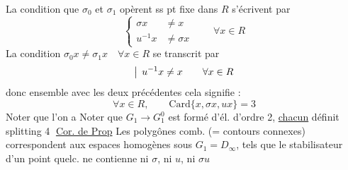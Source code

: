 La condition que  $\sigma_0$ et $\sigma_1$  opèrent ss pt
fixe dans $R$ s'écrivent par
\[
\left\{\begin{aligned}\sigma x&\ne x\\u^{-1}x&\ne\sigma x\end{aligned}\right.\qquad\forall x\in R
\]
La condition $\sigma_0x\ne\sigma_1x\quad\forall x\in R$ se transcrit par
\[
\bigm|\,u^{-1}x\ne x\qquad\forall x\in R
\]
donc ensemble avec les deux précédentes
cela signifie :
\[
\forall x\in R,\qquad\mathrm{Card}\{x,\sigma x,ux\}=3
\]
Noter que l'on a
Noter que $G_1\to G_1^{0}$ est formé d'él. d'ordre 2, \uline{chacun} définit splitting
\textcircled{\small 4} \uline{Cor. de Prop} Les polygônes comb. (= contours
connexes) correspondent aux espaces homogènes
sous $G_1=D_\infty$, tels que le stabilisateur d'un
point quelc. ne contienne ni $\sigma$, ni $u$, ni $\sigma u$


